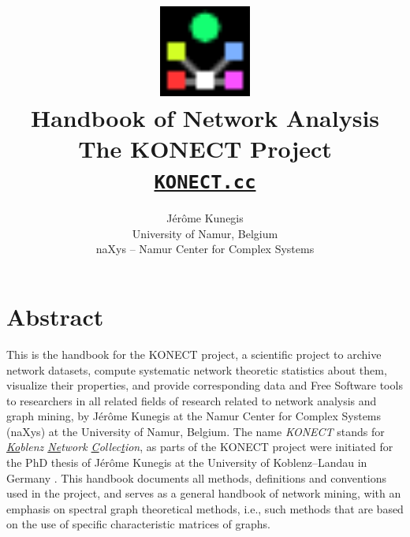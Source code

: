 \documentclass{article}
\begin{document}
\title{
  \includegraphics[width=3cm]{konect-logo} \\
  \vspace{1cm}
         {\Huge Handbook of Network Analysis} \\
         The KONECT Project \\
         \texttt{\href{http://KONECT.cc/}{KONECT.cc}}
}

\author{
  Jérôme Kunegis \\
  University of Namur, Belgium \\
  naXys -- Namur Center for Complex Systems 
}

\maketitle

\section*{Abstract}
This is the handbook for the KONECT project, a scientific project to
archive network datasets, compute systematic network theoretic
statistics about them, visualize their properties, and provide
corresponding data and Free Software tools to researchers in all related
fields of research related to network analysis and graph mining, by
Jérôme Kunegis at the Namur Center for Complex Systems (naXys) at the
University of Namur, Belgium.  The name \emph{KONECT} stands for
\emph{\underline{Ko}blenz \underline{Ne}twork \underline{C}ollec\underline{t}ion}, as parts of the KONECT project
were initiated for the PhD thesis of Jérôme Kunegis at
the University of Koblenz--Landau in Germany \citeyearpar{kunegis:phd}.  This handbook
documents all methods, definitions and conventions used in the project,
and serves as a general handbook of network mining, with an emphasis on
spectral graph theoretical methods, i.e., such methods that are based on
the use of specific characteristic matrices of graphs. 

\thispagestyle{empty}
\newpage
\end{document}
